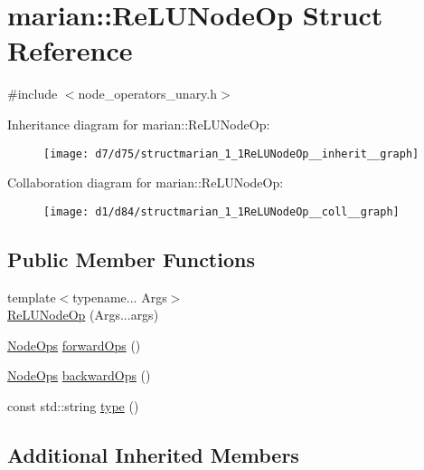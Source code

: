 \hypertarget{structmarian_1_1ReLUNodeOp}{}\section{marian\+:\+:Re\+L\+U\+Node\+Op Struct Reference}
\label{structmarian_1_1ReLUNodeOp}


{\ttfamily \#include $<$node\+\_\+operators\+\_\+unary.\+h$>$}



Inheritance diagram for marian\+:\+:Re\+L\+U\+Node\+Op\+:
\nopagebreak
\begin{figure}[H]
\begin{center}
\leavevmode
\texttt{[image: d7/d75/structmarian\_1\_1ReLUNodeOp\_\_inherit\_\_graph]}
\end{center}
\end{figure}


Collaboration diagram for marian\+:\+:Re\+L\+U\+Node\+Op\+:
\nopagebreak
\begin{figure}[H]
\begin{center}
\leavevmode
\texttt{[image: d1/d84/structmarian\_1\_1ReLUNodeOp\_\_coll\_\_graph]}
\end{center}
\end{figure}
\subsection*{Public Member Functions}
\begin{DoxyCompactItemize}
\item 
{\footnotesize template$<$typename... Args$>$ }\\\hyperlink{structmarian_1_1ReLUNodeOp_a9d78ae7fb96f90cc9946cce6139d33b9}{Re\+L\+U\+Node\+Op} (Args...\+args)
\item 
\hyperlink{namespacemarian_a4956376218cc236016c20bc4071470da}{Node\+Ops} \hyperlink{structmarian_1_1ReLUNodeOp_aa38a8dc93b07420cf7a1dcae7a23dce9}{forward\+Ops} ()
\item 
\hyperlink{namespacemarian_a4956376218cc236016c20bc4071470da}{Node\+Ops} \hyperlink{structmarian_1_1ReLUNodeOp_ad1878b3530b0044d1bc7bbe1ad2d66a1}{backward\+Ops} ()
\item 
const std\+::string \hyperlink{structmarian_1_1ReLUNodeOp_a04b0aeb6dc756ea06cfb27dfaeabd048}{type} ()
\end{DoxyCompactItemize}
\subsection*{Additional Inherited Members}


